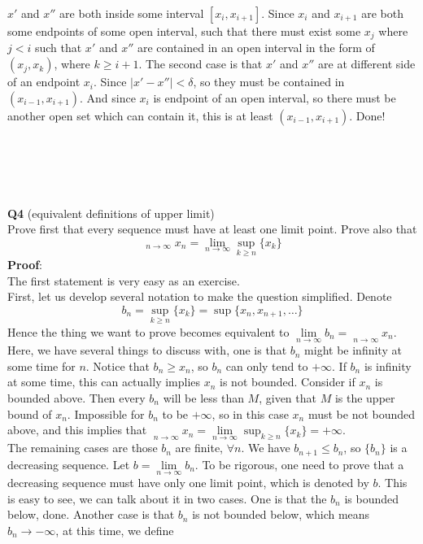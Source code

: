 \documentclass{article}
\DeclareMathOperator*\uplim{\overline{lim}}
\newcommand{\tb}[1]{\textbf{#1}}
\begin{document}
$x'$ and $x''$ are both inside some interval $[x_i, x_{i+1}]$. Since $x_i$ and $x_{i+1}$ are both some endpoints of some open interval, such that there must exist 
some $x_j$ where $j < i$ such that $x'$ and $x''$ are contained in an open interval in the form of $(x_j,x_k)$, where $k \geq i+1$. The second case is that $x'$ and 
$x''$ are at different side of an endpoint $x_i$. Since $|x'-x''|<\delta$, so they must be contained in $(x_{i-1},x_{i+1})$. And since $x_i$ is endpoint of an 
open interval, so there must be another open set which can contain it, this is at least $(x_{i-1},x_{i+1})$. Done!\\
\\
\\
\\
\\
\\
\tb{Q4} (equivalent definitions of upper limit)\\
Prove first that every sequence must have at least one limit point. Prove also that 
$$
\uplim_{n \to \infty} x_n = \lim_{n \to \infty} \sup_{k\geq n} \{x_k\}
$$
\tb{Proof}:\\
The first statement is very easy as an exercise.\\
First, let us develop several notation to make the question simplified. Denote 
$$
b_n = \sup_{k\geq n} \{x_k\} = \sup \{x_n, x_{n+1}, \dots\}
$$
Hence the thing we want to prove becomes equivalent to $\lim\limits_{n \to \infty} b_n = \uplim\limits_{n \to \infty} x_n$.
Here, we have several things to discuss with, one is that $b_n$ might be infinity at some time for $n$.  Notice that $b_n \geq x_n$, so $b_n$ can only tend to 
$+\infty$. If $b_n$ is infinity at some time, this can actually implies $x_n$ is not bounded. Consider if $x_n$ is bounded above. Then every $b_n$ will be less 
than $M$, given that $M$ is the upper bound of $x_n$. Impossible for $b_n$ to be $+\infty$, so in this case $x_n$ must be not bounded above, and this implies that
$\uplim\limits_{n \to \infty} x_n = \lim\limits_{n \to \infty} \sup_{k\geq n} \{x_k\} = + \infty$.\\
The remaining cases are those $b_n$ are finite, $\forall n$. We have $b_{n+1} \leq b_n$, so $\{b_n\}$ is a decreasing sequence. Let $b = \lim\limits_{n \to \infty} b_n$.
To be rigorous, one need to prove that a decreasing sequence must have only one limit point, which is denoted by $b$. This is easy to see, we can talk about it in two 
cases. One is that the $b_n$ is bounded below, done. Another case is that $b_n$ is not bounded below, which means $b_n \rightarrow -\infty$, at this time, we define 
\end{document}
